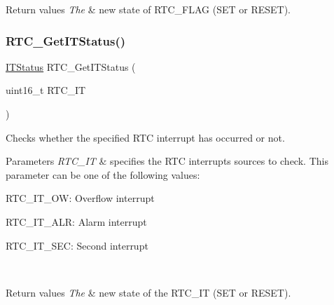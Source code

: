 \begin{DoxyRetVals}{Return values}
{\em The} & new state of R\+T\+C\+\_\+\+F\+L\+AG (S\+ET or R\+E\+S\+ET). \\
\hline
\end{DoxyRetVals}
\mbox{\label{group___r_t_c___private___functions_ga23274ad8aa28e86d5b0d58eee295db21}} 
\subsubsection{\texorpdfstring{RTC\_GetITStatus()}{RTC\_GetITStatus()}}
{\footnotesize\ttfamily \mbox{\hyperlink{group___exported__types_gaacbd7ed539db0aacd973a0f6eca34074}{I\+T\+Status}} R\+T\+C\+\_\+\+Get\+I\+T\+Status (\begin{DoxyParamCaption}\item[{uint16\+\_\+t}]{R\+T\+C\+\_\+\+IT }\end{DoxyParamCaption})}



Checks whether the specified R\+TC interrupt has occurred or not. 


\begin{DoxyParams}{Parameters}
{\em R\+T\+C\+\_\+\+IT} & specifies the R\+TC interrupts sources to check. This parameter can be one of the following values\+: \begin{DoxyItemize}
\item R\+T\+C\+\_\+\+I\+T\+\_\+\+OW\+: Overflow interrupt \item R\+T\+C\+\_\+\+I\+T\+\_\+\+A\+LR\+: Alarm interrupt \item R\+T\+C\+\_\+\+I\+T\+\_\+\+S\+EC\+: Second interrupt \end{DoxyItemize}
\\
\hline
\end{DoxyParams}

\begin{DoxyRetVals}{Return values}
{\em The} & new state of the R\+T\+C\+\_\+\+IT (S\+ET or R\+E\+S\+ET). \\
\hline
\end{DoxyRetVals}
\mbox{\label{group___r_t_c___private___functions_ga175dfe88866234730c1ec40d2221c4f4}} 
